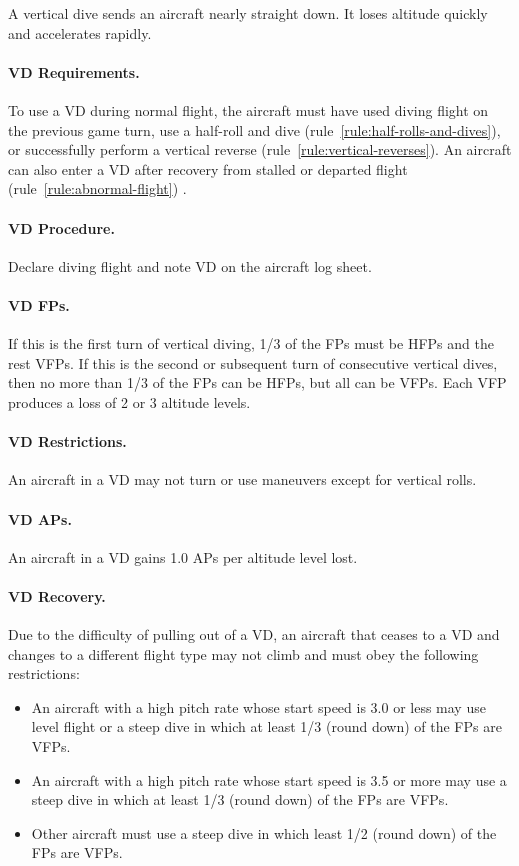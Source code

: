 {A vertical dive sends an aircraft nearly straight down. It loses altitude quickly and accelerates rapidly.

\paragraph{VD Requirements.} To use a VD during normal flight, the aircraft must have used diving flight on the previous game turn, use a half-roll and dive (rule~\ref{rule:half-rolls-and-dives}), or successfully perform a vertical reverse (rule~\ref{rule:vertical-reverses}). An aircraft can also enter a VD after recovery from stalled or departed flight (rule~\ref{rule:abnormal-flight}) .

\paragraph{VD Procedure.} Declare diving flight and note VD on the aircraft log sheet. 

\paragraph{VD FPs.} If this is the first turn of vertical diving, 1/3 of the FPs must be HFPs and the rest VFPs. If this is the second or subsequent turn of consecutive vertical dives, then no more than 1/3 of the FPs can be HFPs, but all can be VFPs. Each VFP produces a loss of 2 or 3 altitude levels.

\paragraph{VD Restrictions.} An aircraft in a VD may not turn or use maneuvers except for vertical rolls. 

\paragraph{VD APs.} An aircraft in a VD gains 1.0 APs per altitude level lost.

\paragraph{VD Recovery.} Due to the difficulty of pulling out of a VD, an aircraft that ceases to a VD and changes to a different flight type may not climb and must obey the following restrictions:
\begin{itemize}
    \item An aircraft with a high pitch rate whose start speed is 3.0 or less may use level flight or a steep dive in which at least 1/3 (round down) of the FPs are VFPs.
    \item An aircraft with a high pitch rate whose start speed is 3.5 or more may use a steep dive in which at least 1/3 (round down) of the FPs are VFPs.
    \item Other aircraft must use a steep dive in which least 1/2 (round down) of the FPs are VFPs.
\end{itemize}

}

